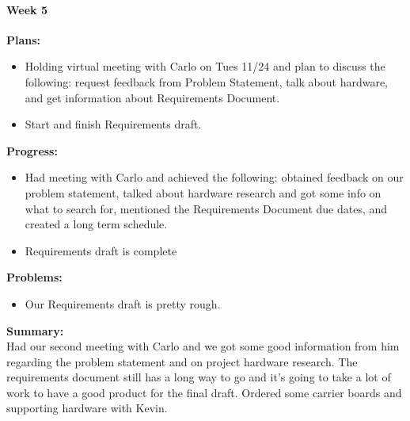 \paragraph{Week 5}
\begin{adjustwidth}{2.5em}{0pt}
    \vspace{-0.5cm}\textbf{Plans:}
    \vspace{-0.5cm}
    \begin{itemize}
        \item Holding virtual meeting with Carlo on Tues 11/24 and plan to discuss the following: request feedback from Problem Statement, talk about hardware, and get information about Requirements Document.
		\item Start and finish Requirements draft.
    \end{itemize} 
    \vspace{-0.3cm}\textbf{Progress:}
    \vspace{-0.5cm}
    \begin{itemize}
        \item Had meeting with Carlo and achieved the following: obtained feedback on our problem statement, talked about hardware research and got some info on what to search for, mentioned the Requirements Document due dates, and created a long term schedule.
		\item Requirements draft is complete
    \end{itemize} 
    \vspace{-0.3cm}\textbf{Problems:}
    \vspace{-0.5cm}
    \begin{itemize}
        \item Our Requirements draft is pretty rough.
    \end{itemize}  
    \vspace{-0.3cm}\noindent\textbf{Summary:}\\
    \noindent Had our second meeting with Carlo and we got some good information from him regarding the problem statement and on project hardware research. The requirements document still has a long way to go and it's going to take a lot of work to have a good product for the final draft. Ordered some carrier boards and supporting hardware with Kevin.
\end{adjustwidth} 

